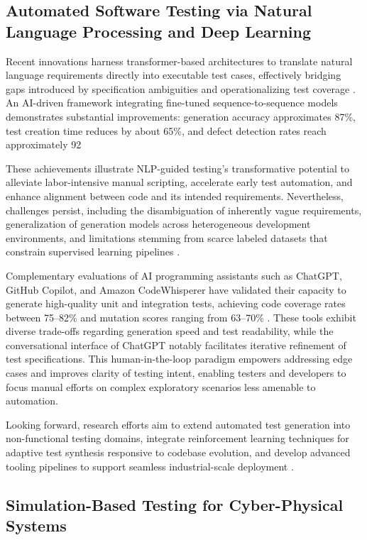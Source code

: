 \documentclass[11pt]{article}
\begin{document}
\subsection{Automated Software Testing via Natural Language Processing and Deep Learning}

Recent innovations harness transformer-based architectures to translate natural language requirements directly into executable test cases, effectively bridging gaps introduced by specification ambiguities and operationalizing test coverage \cite{ref30}. An AI-driven framework integrating fine-tuned sequence-to-sequence models demonstrates substantial improvements: generation accuracy approximates 87\%, test creation time reduces by about 65\%, and defect detection rates reach approximately 92%

These achievements illustrate NLP-guided testing's transformative potential to alleviate labor-intensive manual scripting, accelerate early test automation, and enhance alignment between code and its intended requirements. Nevertheless, challenges persist, including the disambiguation of inherently vague requirements, generalization of generation models across heterogeneous development environments, and limitations stemming from scarce labeled datasets that constrain supervised learning pipelines \cite{ref30}.

Complementary evaluations of AI programming assistants such as ChatGPT, GitHub Copilot, and Amazon CodeWhisperer have validated their capacity to generate high-quality unit and integration tests, achieving code coverage rates between 75--82\% and mutation scores ranging from 63--70\% \cite{ref32}. These tools exhibit diverse trade-offs regarding generation speed and test readability, while the conversational interface of ChatGPT notably facilitates iterative refinement of test specifications. This human-in-the-loop paradigm empowers addressing edge cases and improves clarity of testing intent, enabling testers and developers to focus manual efforts on complex exploratory scenarios less amenable to automation.

Looking forward, research efforts aim to extend automated test generation into non-functional testing domains, integrate reinforcement learning techniques for adaptive test synthesis responsive to codebase evolution, and develop advanced tooling pipelines to support seamless industrial-scale deployment \cite{ref30}.

\subsection{Simulation-Based Testing for Cyber-Physical Systems}
\end{document}
